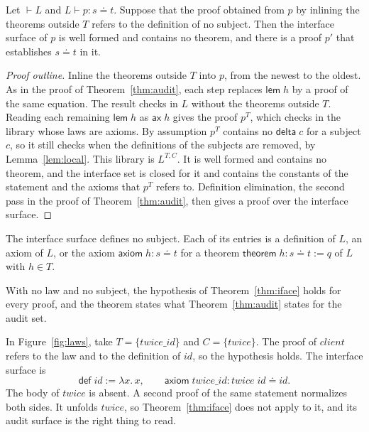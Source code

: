\documentclass[acmsmall,nonacm,screen]{acmart}
\newcommand{\eqd}{\doteq}
\newcommand{\kw}[1]{\mathsf{#1}}
\newcommand{\nm}[1]{\mathit{#1}}
\newcommand{\chk}[4]{#1 \vdash #2 : #3 \eqd #4}
\newcommand{\wf}[1]{\vdash #1}
\newcommand{\view}[1]{#1^{T,C}}
\begin{document}
\begin{theorem}
\label{thm:iface}
Let $\wf{L}$ and $\chk{L}{p}{s}{t}$. Suppose that the proof obtained from $p$ by inlining the
theorems outside $T$ refers to the definition of no subject. Then the interface surface of $p$
is well formed and contains no theorem, and there is a proof $p'$ that establishes $s \eqd t$ in
it.
\end{theorem}

\begin{proof}[Proof outline]
Inline the theorems outside $T$ into $p$, from the newest to the oldest. As in the proof of
Theorem~\ref{thm:audit}, each step replaces $\kw{lem}\;h$ by a proof of the same equation. The
result checks in $L$ without the theorems outside $T$. Reading each remaining $\kw{lem}\;h$ as
$\kw{ax}\;h$ gives the proof $p^T$, which checks in the library whose laws are axioms. By
assumption $p^T$ contains no $\kw{delta}\;c$ for a subject $c$, so it still checks when the
definitions of the subjects are removed, by Lemma~\ref{lem:local}. This library is $\view{L}$.
It is well formed and contains no theorem, and the interface set is closed for it and contains
the constants of the statement and the axioms that $p^T$ refers to. Definition elimination, the
second pass in the proof of Theorem~\ref{thm:audit}, then gives a proof over the interface
surface.
\end{proof}

\begin{proposition}
\label{prop:entries}
The interface surface defines no subject. Each of its entries is a definition of $L$, an axiom of
$L$, or the axiom $\kw{axiom}\;h : s \eqd t$ for a theorem $\kw{theorem}\;h : s \eqd t := q$ of
$L$ with $h \in T$.
\end{proposition}

With no law and no subject, the hypothesis of Theorem~\ref{thm:iface} holds for every proof, and
the theorem states what Theorem~\ref{thm:audit} states for the audit set.

In Figure~\ref{fig:laws}, take $T = \{\nm{twice\_id}\}$ and $C = \{\nm{twice}\}$. The proof of
$\nm{client}$ refers to the law and to the definition of $\nm{id}$, so the hypothesis holds. The
interface surface is
\[
\kw{def}\;\nm{id} := \lambda x.\,x, \qquad
\kw{axiom}\;\nm{twice\_id} : \nm{twice}\;\nm{id} \eqd \nm{id} .
\]
The body of $\nm{twice}$ is absent. A second proof of the same statement normalizes both sides.
It unfolds $\nm{twice}$, so Theorem~\ref{thm:iface} does not apply to it, and its audit surface
is the right thing to read.
\end{document}
